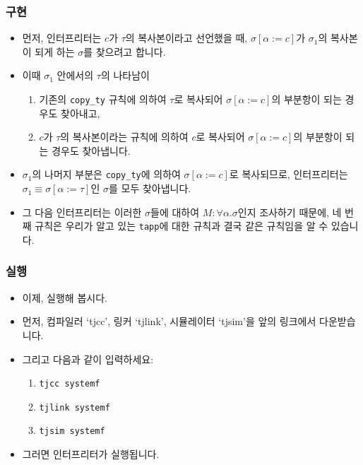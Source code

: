 \documentclass[slidestop,compress,mathserif]{beamer}
\begin{document}
    \begin{frame}
        \frametitle{구현}
        \begin{itemize}
            \item 먼저, 인터프리터는 $c$가 $\tau$의 복사본이라고 선언했을 때, $\sigma \left[ \alpha := c \right]$가 $\sigma_1$의 복사본이 되게 하는 $\sigma$를 찾으려고 합니다.
            \item 이때 $\sigma_1$ 안에서의 $\tau$의 나타남이
            \begin{enumerate}
                \item 기존의 \texttt{copy\_ty} 규칙에 의하여 $\tau$로 복사되어 $\sigma \left[ \alpha := c \right]$의 부분항이 되는 경우도 찾아내고,
                \item $c$가 $\tau$의 복사본이라는 규칙에 의하여 $c$로 복사되어 $\sigma \left[ \alpha := c \right]$의 부분항이 되는 경우도 찾아냅니다.
            \end{enumerate}
            \item $\sigma_1$의 나머지 부분은 \texttt{copy\_ty}에 의하여 $\sigma \left[ \alpha := c \right]$로 복사되므로, 인터프리터는 $\sigma_1 \equiv \sigma \left[ \alpha := \tau \right]$인 $\sigma$를 모두 찾아냅니다.
            \item 그 다음 인터프리터는 이러한 $\sigma$들에 대하여 $M : \forall \alpha . \sigma$인지 조사하기 때문에, 네 번째 규칙은 우리가 알고 있는 \texttt{tapp}에 대한 규칙과 결국 같은 규칙임을 알 수 있습니다.
        \end{itemize}
    \end{frame}

    \begin{frame}
        \frametitle{실행}
        \begin{itemize}
            \item 이제, 실행해 봅시다.
            \item 먼저, 컴파일러 `tjcc', 링커 `tjlink', 시뮬레이터 `tjsim'을 앞의 링크에서 다운받습니다.
            \item 그리고 다음과 같이 입력하세요:
            \begin{enumerate}
                \item \texttt{tjcc systemf}
                \item \texttt{tjlink systemf}
                \item \texttt{tjsim systemf}
            \end{enumerate}
            \item 그러면 인터프리터가 실행됩니다.
        \end{itemize}
    \end{frame}
\end{document}

